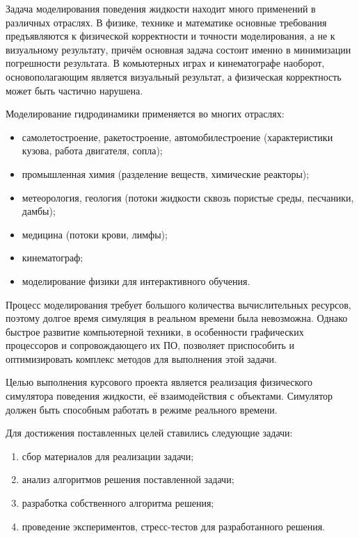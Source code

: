 \Introduction

Задача моделирования поведения жидкости находит много применений в различных отраслях. В физике, технике и математике основные требования предъявляются к физической корректности и точности моделирования, а не к визуальному результату, причём основная задача состоит именно в минимизации погрешности результата. В комьютерных играх и кинематографе наоборот, основополагающим является визуальный результат, а физическая корректность может быть частично нарушена.

Моделирование гидродинамики применяется во многих отраслях:
\begin{itemize}
  \item самолетостроение, ракетостроение, автомобилестроение (характеристики кузова, работа двигателя, сопла);
  \item промышленная химия (разделение веществ, химические реакторы);
  \item метеорология, геология (потоки жидкости сквозь пористые среды, песчаники, дамбы);
  \item медицина (потоки крови, лимфы);
  \item кинематограф;
  \item моделирование физики для интерактивного обучения.
\end{itemize}

Процесс моделирования требует большого количества вычислительных ресурсов, поэтому долгое время симуляция в реальном времени была невозможна. Однако быстрое развитие компьютерной техники, в особенности графических процессоров и сопровождающего их ПО, позволяет приспособить и оптимизировать комплекс методов для выполнения этой задачи.

Целью выполнения курсового проекта является реализация физического симулятора поведения жидкости, её взаимодействия с объектами. Симулятор должен быть способным работать в режиме реального времени.

Для достижения поставленных целей ставились следующие задачи:
\begin{enumerate}
  \item сбор материалов для реализации задачи;
  \item анализ алгоритмов решения поставленной задачи;
  \item разработка собственного алгоритма решения;
  \item проведение экспериментов, стресс-тестов для разработанного решения.
\end{enumerate}
